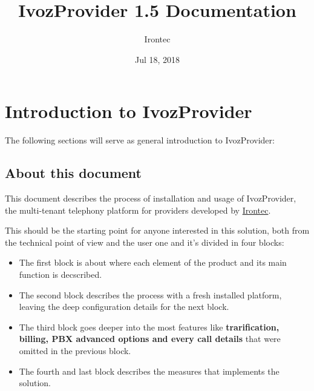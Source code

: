 \documentclass[letterpaper,10pt,english]{sphinxmanual}
\title{IvozProvider 1.5 Documentation}
\date{Jul 18, 2018}
\author{Irontec}
\begin{document}
\maketitle
\tableofcontents
{}\label{index::doc}



\chapter{Introduction to IvozProvider}
\label{basics/intro/index::doc}\label{basics/intro/index:introduction-to-ivozprovider}\label{basics/intro/index:ivozprovider-official-documentation}
The following sections will serve as general introduction to IvozProvider:


\section{About this document}
\label{basics/intro/about:about-this-document}\label{basics/intro/about::doc}
This document describes the process of installation and usage of
IvozProvider, the multi-tenant telephony platform for providers developed
by \href{http://irontec.com}{Irontec}.

This should be the starting point for anyone interested in this solution,
both  from the technical point of view and the user one and it's divided
in four blocks:
\begin{itemize}
\item {} 
The first block is about {\hyperref[index:concepts]{}} where each element of the
product and its main function is decscribed.

\item {} 
The second block describes the {\hyperref[index:installation]{}} process with a fresh
installed platform, leaving the deep configuration details for the next
block.

\item {} 
The third block goes deeper into the most {\hyperref[index:advanced]{}} features like
\textbf{trarification, billing, PBX advanced options and every call details}
that were omitted in the previous block.

\item {} 
The fourth and last block describes the {\hyperref[index:security]{}} measures that
implements the solution.

\end{itemize}
\end{document}

